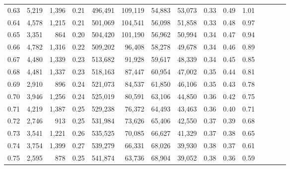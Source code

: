 \begin{tabular}{rrrcrrrrrrrrrrr}
0.63 &   5,219 &   1,396 &                                       0.21 &  496,491 &  109,119 &   54,883 &   53,073 &  0.33 &  0.49 &                         1.01 \\
0.64 &   4,578 &   1,215 &                                       0.21 &  501,069 &  104,541 &   56,098 &   51,858 &  0.33 &  0.48 &                         0.97 \\
0.65 &   3,351 &     864 &                                       0.20 &  504,420 &  101,190 &   56,962 &   50,994 &  0.34 &  0.47 &                         0.94 \\
0.66 &   4,782 &   1,316 &                                       0.22 &  509,202 &   96,408 &   58,278 &   49,678 &  0.34 &  0.46 &                         0.89 \\
0.67 &   4,480 &   1,339 &                                       0.23 &  513,682 &   91,928 &   59,617 &   48,339 &  0.34 &  0.45 &                         0.85 \\
0.68 &   4,481 &   1,337 &                                       0.23 &  518,163 &   87,447 &   60,954 &   47,002 &  0.35 &  0.44 &                         0.81 \\
0.69 &   2,910 &     896 &                                       0.24 &  521,073 &   84,537 &   61,850 &   46,106 &  0.35 &  0.43 &                         0.78 \\
0.70 &   3,946 &   1,256 &                                       0.24 &  525,019 &   80,591 &   63,106 &   44,850 &  0.36 &  0.42 &                         0.75 \\
0.71 &   4,219 &   1,387 &                                       0.25 &  529,238 &   76,372 &   64,493 &   43,463 &  0.36 &  0.40 &                         0.71 \\
0.72 &   2,746 &     913 &                                       0.25 &  531,984 &   73,626 &   65,406 &   42,550 &  0.37 &  0.39 &                         0.68 \\
0.73 &   3,541 &   1,221 &                                       0.26 &  535,525 &   70,085 &   66,627 &   41,329 &  0.37 &  0.38 &                         0.65 \\
0.74 &   3,754 &   1,399 &                                       0.27 &  539,279 &   66,331 &   68,026 &   39,930 &  0.38 &  0.37 &                         0.61 \\
0.75 &   2,595 &     878 &                                       0.25 &  541,874 &   63,736 &   68,904 &   39,052 &  0.38 &  0.36 &                         0.59 \\

\end{tabular}
